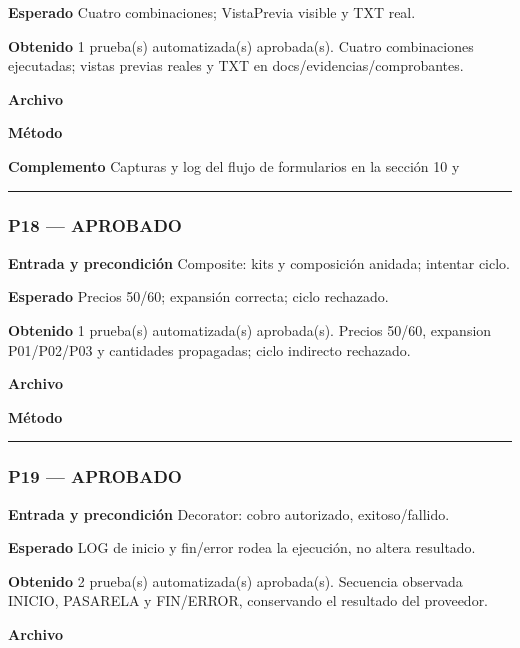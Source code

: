\textbf{Esperado} Cuatro combinaciones; VistaPrevia visible y TXT real.

\textbf{Obtenido} 1 prueba(s) automatizada(s) aprobada(s). Cuatro combinaciones ejecutadas; vistas previas reales y TXT en docs/evidencias/comprobantes.

\textbf{Archivo} \href{https://github.com/Alan77-bot/LogiMarket360Alan/blob/68bda51063441415524ede51bdf61649ee9b4973/tests/LogiMarket.Tests/Patrones/EstructuralesTests.cs}{}

\textbf{Método} 

\textbf{Complemento} Capturas y log del flujo de formularios en la sección 10 y 

\medskip\hrule\medskip
\subsubsection*{P18 --- APROBADO}
\textbf{Entrada y precondición} Composite: kits y composición anidada; intentar ciclo.

\textbf{Esperado} Precios 50/60; expansión correcta; ciclo rechazado.

\textbf{Obtenido} 1 prueba(s) automatizada(s) aprobada(s). Precios 50/60, expansion P01/P02/P03 y cantidades propagadas; ciclo indirecto rechazado.

\textbf{Archivo} \href{https://github.com/Alan77-bot/LogiMarket360Alan/blob/68bda51063441415524ede51bdf61649ee9b4973/tests/LogiMarket.Tests/Dominio/KitsTests.cs}{}

\textbf{Método} 

\medskip\hrule\medskip
\subsubsection*{P19 --- APROBADO}
\textbf{Entrada y precondición} Decorator: cobro autorizado, exitoso/fallido.

\textbf{Esperado} LOG de inicio y fin/error rodea la ejecución, no altera resultado.

\textbf{Obtenido} 2 prueba(s) automatizada(s) aprobada(s). Secuencia observada INICIO, PASARELA y FIN/ERROR, conservando el resultado del proveedor.

\textbf{Archivo} \href{https://github.com/Alan77-bot/LogiMarket360Alan/blob/68bda51063441415524ede51bdf61649ee9b4973/tests/LogiMarket.Tests/Patrones/EstructuralesTests.cs}{}

